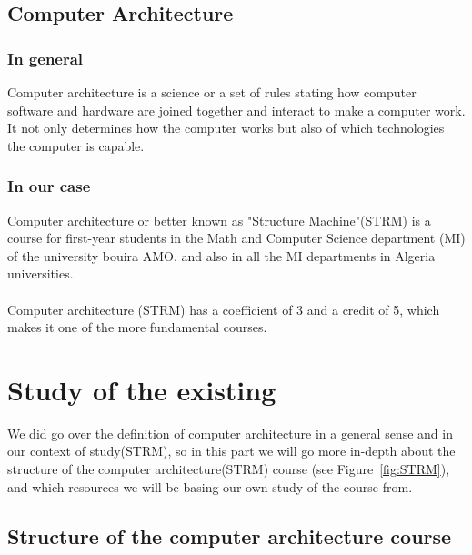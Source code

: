 \subsection{Computer Architecture}
\subsubsection{In general}
Computer architecture is a science or a set of rules stating how computer software and hardware are 
joined together and interact to make a computer work. It not only determines how the computer works 
but also of which technologies the computer is capable.\cite{Pam2018-so}
\subsubsection{In our case}
Computer architecture or better known as "Structure Machine"(STRM) is a course for first-year 
students in the Math and Computer Science department (MI) 
of the university bouira AMO. and also in all the MI departments in Algeria universities.\\ \\
\indent Computer architecture (STRM) has a coefficient of 3 and a credit of 5, which makes it one of the more fundamental courses.

\section{Study of the existing}
We did go over the definition of computer architecture in a general sense and in our context of study(STRM),
so in this part we will go more in-depth about the structure of the computer architecture(STRM) course (see Figure~\ref{fig:STRM}), and which resources we will be basing our own study of the course from.

\subsection{Structure of the computer architecture course}

